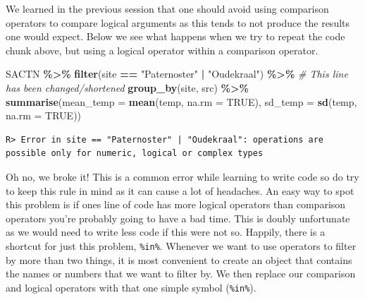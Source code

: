 \documentclass[
]{book}
\newenvironment{Shaded}{\begin{snugshade}}{\end{snugshade}}
\newcommand{\CommentTok}[1]{\textcolor[rgb]{0.56,0.35,0.01}{\textit{#1}}}
\newcommand{\DataTypeTok}[1]{\textcolor[rgb]{0.13,0.29,0.53}{#1}}
\newcommand{\KeywordTok}[1]{\textcolor[rgb]{0.13,0.29,0.53}{\textbf{#1}}}
\newcommand{\NormalTok}[1]{#1}
\newcommand{\OperatorTok}[1]{\textcolor[rgb]{0.81,0.36,0.00}{\textbf{#1}}}
\newcommand{\OtherTok}[1]{\textcolor[rgb]{0.56,0.35,0.01}{#1}}
\newcommand{\StringTok}[1]{\textcolor[rgb]{0.31,0.60,0.02}{#1}}
\begin{document}
We learned in the previous session that one should avoid using comparison operators to compare logical arguments as this tends to not produce the results one would expect. Below we see what happens when we try to repeat the code chunk above, but using a logical operator within a comparison operator.

\begin{Shaded}
\begin{Highlighting}[]
\NormalTok{SACTN }\OperatorTok{\%>\%}\StringTok{ }
\StringTok{  }\KeywordTok{filter}\NormalTok{(site }\OperatorTok{==}\StringTok{ "Paternoster"} \OperatorTok{|}\StringTok{ "Oudekraal"}\NormalTok{) }\OperatorTok{\%>\%}\StringTok{ }\CommentTok{\# This line has been changed/shortened}
\StringTok{  }\KeywordTok{group\_by}\NormalTok{(site, src) }\OperatorTok{\%>\%}\StringTok{ }
\StringTok{  }\KeywordTok{summarise}\NormalTok{(}\DataTypeTok{mean\_temp =} \KeywordTok{mean}\NormalTok{(temp, }\DataTypeTok{na.rm =} \OtherTok{TRUE}\NormalTok{), }
            \DataTypeTok{sd\_temp =} \KeywordTok{sd}\NormalTok{(temp, }\DataTypeTok{na.rm =} \OtherTok{TRUE}\NormalTok{))}
\end{Highlighting}
\end{Shaded}

\begin{verbatim}
R> Error in site == "Paternoster" | "Oudekraal": operations are possible only for numeric, logical or complex types
\end{verbatim}

Oh no, we broke it! This is a common error while learning to write code so do try to keep this rule in mind as it can cause a lot of headaches. An easy way to spot this problem is if ones line of code has more logical operators than comparison operators you're probably going to have a bad time. This is doubly unfortunate as we would need to write less code if this were not so. Happily, there is a shortcut for just this problem, \texttt{\%in\%}. Whenever we want to use operators to filter by more than two things, it is most convenient to create an object that contains the names or numbers that we want to filter by. We then replace our comparison and logical operators with that one simple symbol (\texttt{\%in\%}).
\end{document}
